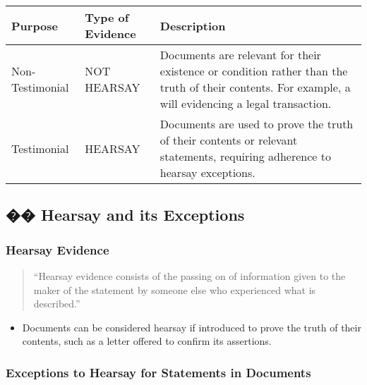 \begin{longtable}[]{@{}
  >{\raggedright\arraybackslash}p{}
  >{\raggedright\arraybackslash}p{}
  >{\raggedright\arraybackslash}p{}@{}}
\toprule\noalign{}
\begin{minipage}[b]{\linewidth}\raggedright
Purpose
\end{minipage} & \begin{minipage}[b]{\linewidth}\raggedright
Type of Evidence
\end{minipage} & \begin{minipage}[b]{\linewidth}\raggedright
Description
\end{minipage} \\
\midrule\noalign{}
\endhead
\bottomrule\noalign{}
\endlastfoot
Non-Testimonial & NOT HEARSAY & Documents are relevant for their
existence or condition rather than the truth of their contents. For
example, a will evidencing a legal transaction. \\
Testimonial & HEARSAY & Documents are used to prove the truth of their
contents or relevant statements, requiring adherence to hearsay
exceptions. \\
\end{longtable}

\subsection{�� Hearsay and its
Exceptions}\label{hearsay-and-its-exceptions}

\subsubsection{Hearsay Evidence}\label{hearsay-evidence}

\begin{quote}
``Hearsay evidence consists of the passing on of information given to
the maker of the statement by someone else who experienced what is
described.''
\end{quote}

\begin{itemize}
\tightlist
\item
  Documents can be considered hearsay if introduced to prove the truth
  of their contents, such as a letter offered to confirm its assertions.
\end{itemize}

\subsubsection{Exceptions to Hearsay for Statements in
Documents}\label{exceptions-to-hearsay-for-statements-in-documents}


